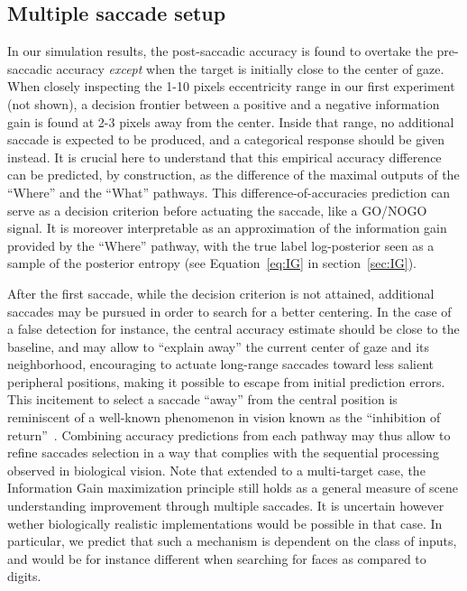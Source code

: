 \subsection{Multiple saccade setup}
%
In our simulation results, the post-saccadic accuracy is found to overtake the pre-saccadic accuracy \emph{except} when the target is initially close to the center of gaze. When closely inspecting the 1-10 pixels eccentricity range in our first experiment (not shown), a decision frontier between a positive and a negative information gain is found at 2-3 pixels away from the center. Inside that range, no additional saccade is expected to be produced, and a categorical response should be given instead. It is crucial here to understand that this empirical accuracy difference can be predicted, by construction, as the difference of the maximal outputs of the ``Where'' and the ``What'' pathways. This difference-of-accuracies prediction can serve as a decision criterion before actuating the saccade, like a GO/NOGO signal. It is moreover interpretable as an approximation of the information gain provided by the ``Where'' pathway, with the true label log-posterior seen as a sample of the posterior entropy (see Equation~\ref{eq:IG} in section~\ref{sec:IG}).

After the first saccade, while the decision criterion is not attained, additional saccades may be pursued in order to search for a better centering. In the case of a false detection for instance, the central accuracy estimate should be close to the baseline, and may allow to ``explain away'' the current center of gaze and its neighborhood, encouraging to actuate long-range saccades toward less salient peripheral positions, making it possible to escape from initial prediction errors. This incitement to select a saccade ``away'' from the central position is reminiscent of a well-known phenomenon in vision known as the ``inhibition of return''~\cite{Itti01}. Combining accuracy predictions from each pathway may thus allow to refine saccades selection in a way that complies with the sequential processing observed in biological vision. Note that extended to a multi-target case, the Information Gain maximization principle still holds as a general measure of scene understanding improvement through multiple saccades. It is uncertain however wether biologically realistic implementations would be possible in that case. In particular, we predict that such a mechanism is dependent on the class of inputs, and would be for instance different when searching for faces as compared to digits.

